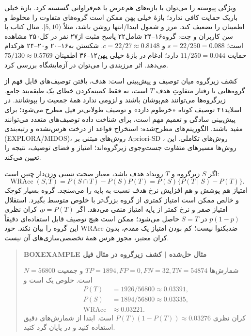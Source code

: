 ویژگی پیوسته را می‌توان با بازه‌های هم‌عرض یا هم‌فراوانی گسسته کرد. بازهٔ خیلی باریک حمایت کافی ندارد؛ بازهٔ خیلی پهن ممکن است گروه‌های متفاوت را مخلوط و اطمینان را تضعیف کند. مرز و شمول ابتدا/انتها روشن باشد، مثلاً $[5,10)$. مثال کتاب با سن کاربران و چت: گروه۱۶--۲۴ شامل۲۲ پاسخ مثبت از۲۷ نفر در کل۲۵۰ مشاهده است؛ $s=22/250=0.088$ و $c=22/27\approx0.8148$. شکستن به۱۶--۲۰ و۲۰--۲۴ هرکدام حمایت $11/250=0.044$ دارد؛ ادغام در بازهٔ خیلی پهن۱۲--۳۶ اطمینان $75/130\approx0.5769$ می‌دهد. اثر مرزبندی را می‌توان در آزمایشگاه بررسی کرد.

کشف زیرگروه میان توصیف و پیش‌بینی است: هدف، یافتن توصیف‌های قابل فهم از گروه‌هایی با رفتار متفاوتِ هدف $T$ است، نه فقط کمینه‌کردن خطای یک طبقه‌بند جامع. زیرگروه‌ها می‌توانند هم‌پوشان باشند و لزومی ندارد همهٔ جمعیت را بپوشانند. در اسلاید۴۱ توصیف کوتاه «خرطوم دارد» و توصیف طولانی‌تر فیل مطرح می‌شود؛ برای پیش‌بینی سادگی و تعمیم مهم است، برای شناخت داده توصیف‌های متعدد می‌توانند مفید باشند. الگوریتم‌های مطرح‌شده: استخراج قواعد از درخت هرس‌نشده و رتبه‌بندی (EXPLORA/MIDOS)، روش‌های مبتنی بر Apriori-SD ، روش‌های تکاملی. این روش‌ها مسیرهای متفاوت جست‌وجوی زیرگروه‌اند؛ امتیاز و فضای توصیف، نتیجه را تعیین می‌کند.

اگر $S$ زیرگروه و $T$ رویداد هدف باشد، معیار صحت نسبی وزن‌دار چنین است:
\[\operatorname{WRAcc}(S,T)=P(S\cap T)-P(S)P(T)=P(S)\{P(T\mid S)-P(T)\}.\]
امتیاز هم پوشش و هم افزایش نرخ هدف نسبت به پایه را می‌سنجد. گروه بسیار کوچک و خالص ممکن است امتیاز کمتری از گروه بزرگ‌تر با خلوص متوسط بگیرد. استقلال امتیاز صفر و نرخ کمتر از پایه امتیاز منفی می‌دهد. اگر $p=P(T)$، کران نظری $p(1-p)$ در $S=T$ حاصل می‌شود؛ ممکن است هیچ توصیف قابل استفاده‌ای دقیقاً این گروه را بیان نکند. خود WRAcc ضدیکنوا نیست؛ کم بودن امتیاز یک مقدم، بدون کران معتبر، مجوز هرس همهٔ تخصصی‌سازی‌های آن نیست.

\begin{quote}\textbf{BOXEXAMPLE مثال حل‌شده | کشف زیرگروه در مثال فیل}\par 
شمارش‌ها $TP=1894,FP=0,FN=32,TN=54874$ و جمعیت $N=56800$ است. خلوص یک است و
\begin{align*}
P(T)&=1926/56800\approx0.03391,\\
P(S)&=1894/56800\approx0.03335,\\
\operatorname{WRAcc}&\approx0.03221.
\end{align*}
کران نظری $P(T)(1-P(T))\approx0.03276$ است. ابتدا از شمارش‌های دقیق استفاده کنید و در پایان گرد کنید.
\end{quote}

